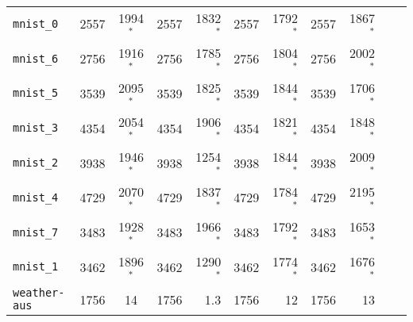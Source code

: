 \begin{tabular}{lccrrrrrrrr}
\texttt{mnist\_0} & 2557 & 1994$^*$ & 2557 & 1832$^*$ & 2557 & 1792$^*$ & 2557 & 1867$^*$\\
\texttt{mnist\_6} & 2756 & 1916$^*$ & 2756 & 1785$^*$ & 2756 & 1804$^*$ & 2756 & 2002$^*$\\
\texttt{mnist\_5} & 3539 & 2095$^*$ & 3539 & 1825$^*$ & 3539 & 1844$^*$ & 3539 & 1706$^*$\\
\texttt{mnist\_3} & 4354 & 2054$^*$ & 4354 & 1906$^*$ & 4354 & 1821$^*$ & 4354 & 1848$^*$\\
\texttt{mnist\_2} & 3938 & 1946$^*$ & 3938 & 1254$^*$ & 3938 & 1844$^*$ & 3938 & 2009$^*$\\
\texttt{mnist\_4} & 4729 & 2070$^*$ & 4729 & 1837$^*$ & 4729 & 1784$^*$ & 4729 & 2195$^*$\\
\texttt{mnist\_7} & 3483 & 1928$^*$ & 3483 & 1966$^*$ & 3483 & 1792$^*$ & 3483 & 1653$^*$\\
\texttt{mnist\_1} & 3462 & 1896$^*$ & 3462 & 1290$^*$ & 3462 & 1774$^*$ & 3462 & 1676$^*$\\
\texttt{weather-aus} & 1756 & 14 & 1756 & 1.3 & 1756 & 12 & 1756 & 13\\
\bottomrule
\end{tabular}
